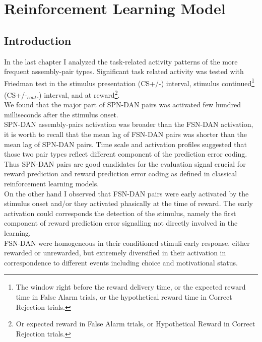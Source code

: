 \chapter{Reinforcement Learning Model}
\label{chap:RLModel}
\section{Introduction}
\label{sec:IntroRL}
In the last chapter I analyzed the task-related activity patterns of the more frequent assembly-pair types. Significant task related activity was tested with Friedman test in the stimulus presentation (CS+/-) interval, stimulus continued\footnote{The window right before the reward delivery time, or the expected reward time in False Alarm trials, or the hypothetical reward time in Correct Rejection trials.} (CS+/-$_{cont}$.) interval, and at reward\footnote{Or expected reward in False Alarm trials, or Hypothetical Reward in Correct Rejection trials.}.\\We found that the major part of SPN-DAN pairs was activated few hundred milliseconds after the stimulus onset.\\SPN-DAN assembly-pairs activation was broader than the FSN-DAN activation, it is worth to recall that the mean lag of FSN-DAN pairs was shorter than the mean lag of SPN-DAN pairs. Time scale and activation profiles suggested that those two pair types reflect different component of the prediction error coding. Thus SPN-DAN pairs are good candidates for the evaluation signal crucial for reward prediction and reward prediction error coding as defined in classical reinforcement learning models.\\On the other hand I observed that FSN-DAN pairs were early activated by the stimulus onset and/or they activated phasically at the time of reward. The early activation could corresponds the detection of the stimulus, namely the first component of reward prediction error signalling not directly involved in the learning.\\FSN-DAN were homogeneous in their conditioned stimuli early response, either rewarded or unrewarded, but extremely diversified in their activation in correspondence to different events including choice and motivational status.\\ %
